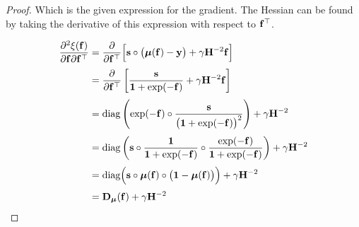 \begin{proof}
    Which is the given expression for the gradient. The Hessian can be found by taking the derivative of this expression with respect to $\mathbf{f}^\top$. 

    \begin{align*}
        \frac{\partial^2\xi(\mathbf{f})}{\partial \mathbf{f} \partial \mathbf{f}^\top}  &= \frac{\partial }{\partial \mathbf{f}^\top} \Big[\mathbf{s} \circ \big(\boldsymbol{\mu}(\mathbf{f}) - \mathbf{y}\big) + \gamma \mathbf{H}^{-2} \mathbf{f} \Big] \\[0.1cm]
        &= \frac{\partial }{\partial \mathbf{f}^\top} \left[\frac{\mathbf{s}}{\mathbf{1} + \exp(-\mathbf{f})} + \gamma \mathbf{H}^{-2} \mathbf{f} \right] \\[0.1cm]
        &= \text{\textup{diag}}\left(\exp(-\mathbf{f}) \circ \frac{\mathbf{s}}{\big(\mathbf{1} + \exp(-\mathbf{f})\big)^2}\right) + \gamma \mathbf{H}^{-2} \\[0.1cm]
        &= \text{\textup{diag}}\left(\mathbf{s} \circ \frac{\mathbf{1}}{\mathbf{1} + \exp(-\mathbf{f})} \circ \frac{\exp(-\mathbf{f})}{\mathbf{1} + \exp(-\mathbf{f})}\right) + \gamma \mathbf{H}^{-2} \\[0.1cm]
        &= \text{diag}\Big(\mathbf{s} \circ \boldsymbol{\mu}(\mathbf{f}) \circ \big(\mathbf{1} - \boldsymbol{\mu}(\mathbf{f})\big)\Big) + \gamma \mathbf{H}^{-2}\\[0.1cm]
        &= \mathbf{D}_{\boldsymbol{\mu}}(\mathbf{f}) + \gamma \mathbf{H}^{-2}
    \end{align*}
    

\end{proof}